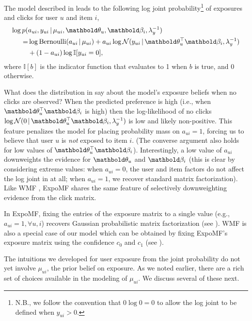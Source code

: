 The model described in 
leads to the following log joint probability\footnote{N.B., we follow the convention that $0 \log 0 = 0$ to allow the log joint to be defined when $y_{ui}>0$.} of exposures and clicks 
for user $u$ and item $i$,
\begin{equation}
\begin{split}
	\log p( & a_{ui}, y_{ui} \g \mu_{ui}, \mb\theta_u, \mb\beta_i, \lambda_y^{-1}) \\ 
	= & \log \mathrm{Bernoulli}(a_{ui} \g \mu_{ui}) + 
	a_{ui} \log \mathcal{N}(y_{ui} \g \mb\theta_u^\top \mb\beta_i, \lambda_y^{-1}) \\
	& + (1-a_{ui}) \log \mathbb{I}[y_{ui}=0], %
	\end{split}
	\label{eq:a_y_joint}
\end{equation}
where $\mathbb{I}[b]$ is the indicator function that evaluates to 1 when $b$ is true, and 0 otherwise. 

What does the distribution in  say 
about the model's exposure beliefs when no clicks are observed? 
When the predicted preference is high 
(i.e., when $\mb\theta_u^\top \mb\beta_i$ is high) 
then the log-likelihood of no clicks $\log \mathcal{N}(0 \g \mb\theta_u^\top \mb\beta_i, \lambda^{-1}_y)$ is low and likely non-positive.
This feature penalizes the model 
for placing probability mass on $a_{ui}=1$, 
forcing us to believe that user $u$ is \emph{not} exposed to item $i$. 
(The converse argument also holds for low values of $\mb\theta_u^\top \mb\beta_i$). 
Interestingly, a low value of $a_{ui}$ 
downweights the evidence for $\mb\theta_u$ and $\mb\beta_i$ 
(this is clear by considering extreme values: 
when $a_{ui}=0$, the user and item factors do not affect the log joint in  at all; 
when $a_{ui}=1$, we recover standard matrix factorization). 
Like \gls{WMF} \citep{hu2008collaborative}, ExpoMF shares the same feature of selectively downweighting evidence from the click matrix. 

In ExpoMF, fixing the entries of the exposure matrix to a single value
(e.g., $a_{ui}=1, \forall u, i$) recovers Gaussian probabilistic matrix
factorization \cite{mnih2007probabilistic} (see ). \gls{WMF} is also a special case of
our model which can be obtained by fixing ExpoMF's exposure matrix using the confidence $c_0$ and $c_1$ (see ).

The intuitions we developed for 
user exposure from the joint probability 
do not yet involve $\mu_{ui}$, 
the prior belief on exposure. 
As we noted earlier, 
there are a rich set of choices 
available in the modeling of $\mu_{ui}$. 
We discuss several of these next.

